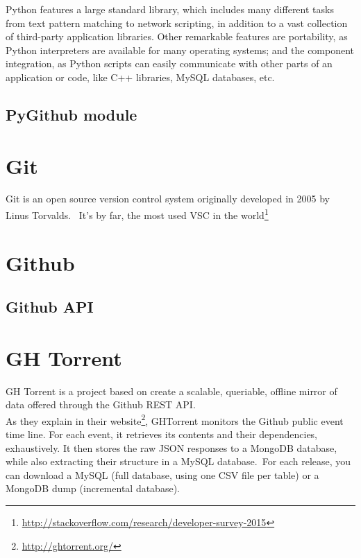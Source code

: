 \documentclass[a4paper, 12pt]{book}
\begin{document}
Python features a large standard library, which includes many different tasks from text pattern matching to network
scripting, in addition to a vast collection of third-party application libraries.
Other remarkable features are portability, as Python interpreters are available for many operating systems;
and the component integration, as Python scripts can easily communicate with other parts of an application or code,
like C++ libraries, MySQL databases, etc.\\

\subsection{PyGithub module}
\label{sec:pygithub}

\section{Git}
\label{sec:git}
Git is an open source version control system originally developed in 2005 by Linus Torvalds. \
It's by far, the most used VSC in the world\footnote{\url{http://stackoverflow.com/research/developer-survey-2015}}

\section{Github}
\label{sec:github}

\subsection{Github API}

\section{GH Torrent}
\label{sec:ghtorrent}
GH Torrent is a project based on create a scalable, queriable, offline mirror of data offered through the Github REST API.\\
As they explain in their website\footnote{\url{http://ghtorrent.org/}}, GHTorrent monitors the Github public event time line.
For each event, it retrieves its contents and their dependencies, exhaustively. It then stores the raw JSON responses to a MongoDB
database, while also extracting their structure in a MySQL database.\
For each release, you can download a MySQL (full database, using one CSV file per table) or a MongoDB dump (incremental database).\\
\end{document}
